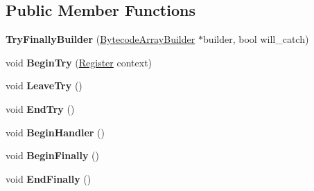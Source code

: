 \subsection*{Public Member Functions}
\begin{DoxyCompactItemize}
\item 
{\bfseries Try\+Finally\+Builder} (\hyperlink{classv8_1_1internal_1_1interpreter_1_1_bytecode_array_builder}{Bytecode\+Array\+Builder} $\ast$builder, bool will\+\_\+catch)\hypertarget{classv8_1_1internal_1_1interpreter_1_1_try_finally_builder_aeba13c500ed06ba6c07963e3bef10337}{}\label{classv8_1_1internal_1_1interpreter_1_1_try_finally_builder_aeba13c500ed06ba6c07963e3bef10337}

\item 
void {\bfseries Begin\+Try} (\hyperlink{classv8_1_1internal_1_1interpreter_1_1_register}{Register} context)\hypertarget{classv8_1_1internal_1_1interpreter_1_1_try_finally_builder_addf8f0a64110b6c5bd16a4d73a133cf3}{}\label{classv8_1_1internal_1_1interpreter_1_1_try_finally_builder_addf8f0a64110b6c5bd16a4d73a133cf3}

\item 
void {\bfseries Leave\+Try} ()\hypertarget{classv8_1_1internal_1_1interpreter_1_1_try_finally_builder_a973dd22cfc207943b678444654542a3a}{}\label{classv8_1_1internal_1_1interpreter_1_1_try_finally_builder_a973dd22cfc207943b678444654542a3a}

\item 
void {\bfseries End\+Try} ()\hypertarget{classv8_1_1internal_1_1interpreter_1_1_try_finally_builder_a82ec83eb8a7a9a5459798d12bd30c126}{}\label{classv8_1_1internal_1_1interpreter_1_1_try_finally_builder_a82ec83eb8a7a9a5459798d12bd30c126}

\item 
void {\bfseries Begin\+Handler} ()\hypertarget{classv8_1_1internal_1_1interpreter_1_1_try_finally_builder_a19da492591acefe3e5c0626fc7fadffe}{}\label{classv8_1_1internal_1_1interpreter_1_1_try_finally_builder_a19da492591acefe3e5c0626fc7fadffe}

\item 
void {\bfseries Begin\+Finally} ()\hypertarget{classv8_1_1internal_1_1interpreter_1_1_try_finally_builder_a6b90023f87875bc6c84a4bc305766990}{}\label{classv8_1_1internal_1_1interpreter_1_1_try_finally_builder_a6b90023f87875bc6c84a4bc305766990}

\item 
void {\bfseries End\+Finally} ()\hypertarget{classv8_1_1internal_1_1interpreter_1_1_try_finally_builder_a343cae5354906ec289737e2b08c8e8cb}{}\label{classv8_1_1internal_1_1interpreter_1_1_try_finally_builder_a343cae5354906ec289737e2b08c8e8cb}

\end{DoxyCompactItemize}
